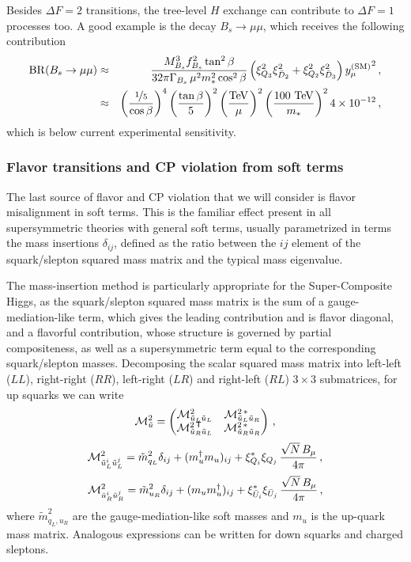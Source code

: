 \documentclass[a4paper,12pt]{article}
\newcommand{\bea}{\begin{eqnarray}}
\newcommand{\eea}{\end{eqnarray}}
\newcommand{\beq}{\begin{equation}}
\newcommand{\eeq}{\end{equation}}
\def\mst{m_*}
\begin{document}
{{{{Besides $\Delta F=2$ transitions, the tree-level $H$ exchange can contribute to $\Delta F=1$ processes too. A good example is the decay $B_s \to \mu \mu$, which receives the following contribution 
\bea
{\rm BR} (B_s \to \mu \mu)&\approx &\frac{M_{B_s}^3 f_{B_s}^2 \tan^2\beta}{32 \pi \Gamma_{B_s}\, \mu^2 \mst^2 \cos^2\beta} \left( \xi_{Q_3}^2 \xi_{{\bar D}_2}^2 + \xi_{Q_2}^2 \xi_{{\bar D}_3}^2\right) 
{y_{\mu}^{({\rm SM})}}^2\, ,
\nonumber \\ &\approx &
\left( \frac{\nicefrac{1}{5}}{\cos\beta} \right)^4
\left( \frac{\tan\beta}{5} \right)^2
\left( \frac{\rm TeV}{\mu}\right)^2
\left( \frac{100~{\rm TeV}}{\mst}\right)^2
4 \times 10^{-12} \, ,
\label{bsmumu}
\eea
which is below current experimental sensitivity.

\boldmath
\subsubsection*{Flavor transitions and CP violation from soft terms}
\unboldmath

The last source of flavor and CP violation that we will consider is flavor misalignment in soft terms. This is the familiar effect present in all supersymmetric theories with general soft terms, usually parametrized in terms the mass insertions $\delta_{ij}$, defined as the ratio between the $ij$ element of the squark/slepton squared mass matrix and the typical mass eigenvalue. 

The mass-insertion method is particularly appropriate for the Super-Composite Higgs, as the squark/slepton squared mass matrix is the sum of a gauge-mediation-like term, which gives the leading contribution and is flavor diagonal, and a flavorful contribution, whose structure is governed by partial compositeness, as well as a supersymmetric term equal to the corresponding squark/slepton masses. Decomposing the scalar squared mass matrix into left-left ($LL$), right-right ($RR$), left-right ($LR$) and right-left ($RL$) $3\times 3$ submatrices, for up squarks we can write 
\beq
{\cal M}^2_{\tilde u} =
\begin{pmatrix}
{\cal M}^2_{{\tilde u}_L{\tilde u}_L} & 
{\cal M}^{2\, *}_{{\tilde u}_L{\tilde u}_R} \\
{\cal M}^{2\, \mathsf{T}}_{{\tilde u}_R{\tilde u}_L} & 
{\cal M}^{2\, *}_{{\tilde u}_R{\tilde u}_R} \\
\end{pmatrix}
\, ,
\eeq
\beq
{\cal M}^2_{{\tilde u}_L^i {\tilde u}_L^j} =
{\tilde m}_{q_L}^2 \delta_{ij} + (m_u^\dagger m_u)_{ij} + \xi_{Q_i}^* \xi_{Q_j} \, \frac{\sqrt{N} \, B_\mu}{4\pi} \, ,
\eeq
\beq
{\cal M}^2_{{\tilde u}_R^i {\tilde u}_R^j} =
{\tilde m}_{u_R}^2 \delta_{ij} + (m_u m_u^\dagger)_{ij} + \xi_{{\bar U}_i}^* \xi_{{\bar U}_j} \, \frac{\sqrt{N} \, B_\mu}{4\pi} \, ,
\eeq
where ${\tilde m}_{q_L,u_R}^2$ are the gauge-mediation-like soft masses and $m_u$ is the up-quark mass matrix. Analogous expressions can be written for down squarks and charged sleptons.

}}}}
\end{document}
